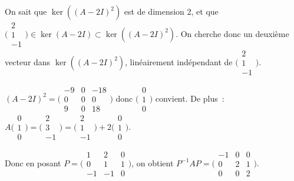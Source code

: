 {{On sait que $\ker((A-2I)^{2})$ est de dimension 2, et que $\Big(\begin{smallmatrix}%
    2\\1\\-1%
  \end{smallmatrix}\Big)\in\ker(A-2I)\subset\ker((A-2I)^{2})$.
 On cherche donc un deuxième vecteur dans $\ker((A-2I)^{2})$, linéairement
 indépendant de $\Big(\begin{smallmatrix}%
    2\\1\\-1%
  \end{smallmatrix}\Big)$.

$(A-2I)^{2}=\Big(\begin{smallmatrix}%
    -9&0&-18\\0&0&0\\9&0&18%
  \end{smallmatrix}\Big)$
donc $\Big(\begin{smallmatrix}%
    0\\1\\0%
  \end{smallmatrix}\Big)$
convient. De plus~: $A\Big(\begin{smallmatrix}%
    0\\1\\0%
  \end{smallmatrix}\Big)=\Big(\begin{smallmatrix}%
    2\\3\\-1%
  \end{smallmatrix}\Big)=\Big(\begin{smallmatrix}%
    2\\1\\-1%
  \end{smallmatrix}\Big)+2\Big(\begin{smallmatrix}%
    0\\1\\0%
  \end{smallmatrix}\Big)$.

Donc en posant $P=\Big(\begin{smallmatrix}%
    1&2&0\\0&1&1\\-1&-1&0%
  \end{smallmatrix}\Big)$, on obtient
$P^{-1}AP=\Big(\begin{smallmatrix}%
    -1&0&0\\0&2&1\\0&0&2%
  \end{smallmatrix}\Big)$.
}
}
